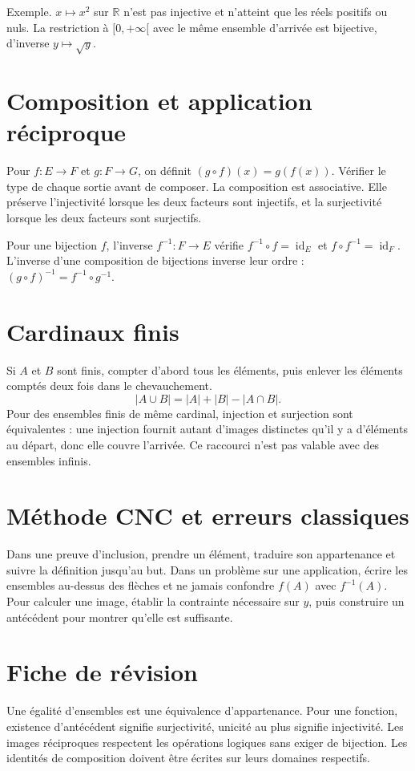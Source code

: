 \documentclass[11pt,a4paper]{article}
\begin{document}
Exemple. $x\mapsto x^2$ sur $\mathbb R$ n’est pas injective et n’atteint que les réels positifs ou nuls. La restriction à $[0,+\infty[$ avec le même ensemble d’arrivée est bijective, d’inverse $y\mapsto\sqrt y$.

\section*{Composition et application réciproque}
Pour $f:E\to F$ et $g:F\to G$, on définit $(g\circ f)(x)=g(f(x))$. Vérifier le type de chaque sortie avant de composer. La composition est associative. Elle préserve l’injectivité lorsque les deux facteurs sont injectifs, et la surjectivité lorsque les deux facteurs sont surjectifs.

Pour une bijection $f$, l’inverse $f^{-1}:F\to E$ vérifie $f^{-1}\circ f=\operatorname{id}_E$ et $f\circ f^{-1}=\operatorname{id}_F$. L’inverse d’une composition de bijections inverse leur ordre : $(g\circ f)^{-1}=f^{-1}\circ g^{-1}$.

\section*{Cardinaux finis}
Si $A$ et $B$ sont finis, compter d’abord tous les éléments, puis enlever les éléments comptés deux fois dans le chevauchement.
\[ |A\cup B|=|A|+|B|-|A\cap B|. \]
Pour des ensembles finis de même cardinal, injection et surjection sont équivalentes : une injection fournit autant d’images distinctes qu’il y a d’éléments au départ, donc elle couvre l’arrivée. Ce raccourci n’est pas valable avec des ensembles infinis.

\section*{Méthode CNC et erreurs classiques}
Dans une preuve d’inclusion, prendre un élément, traduire son appartenance et suivre la définition jusqu’au but. Dans un problème sur une application, écrire les ensembles au-dessus des flèches et ne jamais confondre $f(A)$ avec $f^{-1}(A)$. Pour calculer une image, établir la contrainte nécessaire sur $y$, puis construire un antécédent pour montrer qu’elle est suffisante.

\section*{Fiche de révision}
Une égalité d’ensembles est une équivalence d’appartenance. Pour une fonction, existence d’antécédent signifie surjectivité, unicité au plus signifie injectivité. Les images réciproques respectent les opérations logiques sans exiger de bijection. Les identités de composition doivent être écrites sur leurs domaines respectifs.
\end{document}
